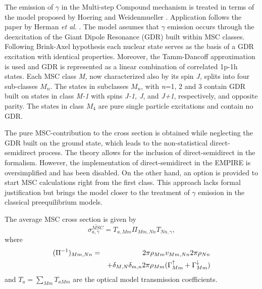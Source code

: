 The emission of $\gamma$ in the Multi-step Compound%
 mechanism is treated in terms of the model proposed by Hoering
and Weidenmueller \cite{GammaMSC}. Application follows the paper by Herman 
\emph{et al}. \cite{GammaMSCapp}. The model assumes that $\gamma$ emission
occurs through the deexcitation of the Giant Dipole Resonance (GDR) built
within MSC%
 classes. Following Brink-Axel hypothesis \cite{Axel,Brink,Brinka}
each nuclear state serves as the basis of a GDR excitation with identical
properties. Moreover, the Tamm-Dancoff approximation is used and GDR is
represented as a linear combination of correlated 1p-1h states. Each MSC
class \emph{M,} now characterized also by its spin \emph{J,} splits into
four sub-classes $M_{n}$. The states in subclasses $M_{n}$, with \emph{n}=1,
2 and 3 contain GDR built on states in class \emph{M-1} with spins \emph{%
J-1, J}, and \emph{J+1}, respectively, and opposite parity. The states in
class $M_{4}$ are pure single particle excitations and contain no GDR.

The pure MSC-contribution to the cross section is obtained while neglecting
the GDR built on the ground state, which leads to the non-statistical
direct-semidirect process. The theory \cite{GammaMSC} allows for the
inclusion of direct-semidirect in the formalism. However, the implementation
of direct-semidirect in the EMPIRE is oversimplified and has been disabled.
On the other hand, an option is provided to start MSC%
 calculations right from the first class. This approach lacks
formal justification but brings the model closer to the treatment of $\gamma$
emission in the classical preequilibrium models.

The average MSC cross section is given by 
\begin{equation}
\overline{\sigma_{a,\gamma}^{MSC}}=T_{a,Mm}\Pi_{Mm,Nn}T_{Nn,\gamma},
\label{GammaMSCxs}
\end{equation}
where 
\begin{eqnarray}
(\Pi^{-1})_{Mm,Nn} & = & 2\pi\rho_{Mm}v_{Mm,Nn}2\pi\rho_{Nn}  \notag \\
& &
+\delta_{M,N}\delta_{m,n}2\pi\rho_{Mm}(\Gamma_{Mm}^{\uparrow}+\Gamma_{Mm}^{%
\downarrow})  \label{Pigamma}
\end{eqnarray}
and $T_{a}=\sum_{Mm}T_{aMm}$ are the optical model transmission coefficients.

